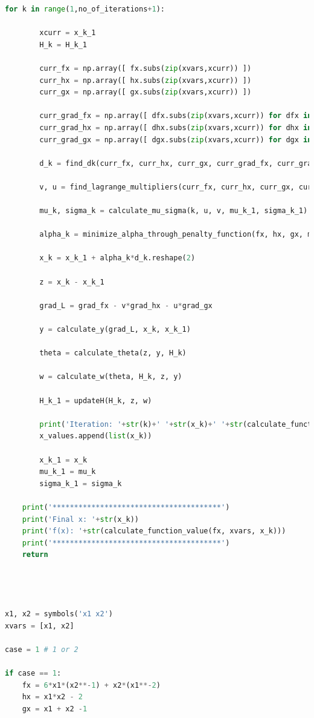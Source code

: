 \documentclass{article}
\begin{document}
\begin{lstlisting}[language=Python, caption=main.py]
    for k in range(1,no_of_iterations+1):

        xcurr = x_k_1
        H_k = H_k_1

        curr_fx = np.array([ fx.subs(zip(xvars,xcurr)) ])
        curr_hx = np.array([ hx.subs(zip(xvars,xcurr)) ])
        curr_gx = np.array([ gx.subs(zip(xvars,xcurr)) ])

        curr_grad_fx = np.array([ dfx.subs(zip(xvars,xcurr)) for dfx in grad_fx ])
        curr_grad_hx = np.array([ dhx.subs(zip(xvars,xcurr)) for dhx in grad_hx ])
        curr_grad_gx = np.array([ dgx.subs(zip(xvars,xcurr)) for dgx in grad_gx ])

        d_k = find_dk(curr_fx, curr_hx, curr_gx, curr_grad_fx, curr_grad_hx, curr_grad_gx, H_k)

        v, u = find_lagrange_multipliers(curr_fx, curr_hx, curr_gx, curr_grad_fx, curr_grad_hx, curr_grad_gx, H_k, d_k)

        mu_k, sigma_k = calculate_mu_sigma(k, u, v, mu_k_1, sigma_k_1)

        alpha_k = minimize_alpha_through_penalty_function(fx, hx, gx, mu_k, sigma_k, x_k_1, d_k)

        x_k = x_k_1 + alpha_k*d_k.reshape(2)

        z = x_k - x_k_1

        grad_L = grad_fx - v*grad_hx - u*grad_gx

        y = calculate_y(grad_L, x_k, x_k_1)

        theta = calculate_theta(z, y, H_k)

        w = calculate_w(theta, H_k, z, y)

        H_k_1 = updateH(H_k, z, w)

        print('Iteration: '+str(k)+' '+str(x_k)+' '+str(calculate_function_value(fx, xvars, x_k)))
        x_values.append(list(x_k))

        x_k_1 = x_k
        mu_k_1 = mu_k
        sigma_k_1 = sigma_k

    print('***************************************')
    print('Final x: '+str(x_k))
    print('f(x): '+str(calculate_function_value(fx, xvars, x_k)))
    print('***************************************')
    return




x1, x2 = symbols('x1 x2')
xvars = [x1, x2]

case = 1 # 1 or 2

if case == 1:
    fx = 6*x1*(x2**-1) + x2*(x1**-2)
    hx = x1*x2 - 2
    gx = x1 + x2 -1


\end{lstlisting}
\end{document}
